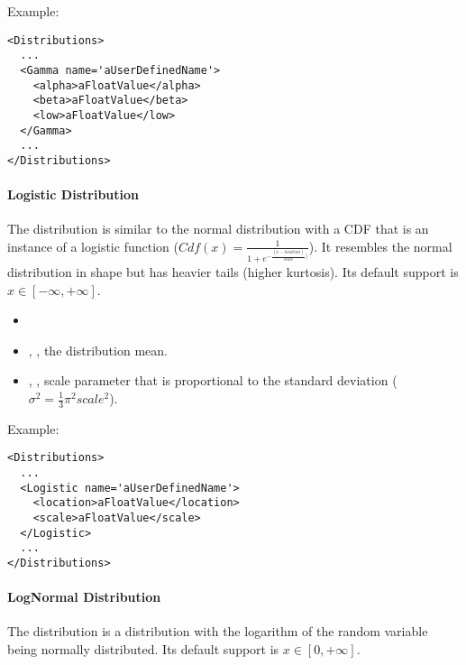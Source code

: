 Example:
\begin{lstlisting}[style=XML]
<Distributions>
  ...
  <Gamma name='aUserDefinedName'>
    <alpha>aFloatValue</alpha>
    <beta>aFloatValue</beta>
    <low>aFloatValue</low>
  </Gamma>
  ...
</Distributions>
\end{lstlisting}

\paragraph{Logistic Distribution}
\label{Logistic}
The  distribution is similar to the
normal distribution with a CDF that is an instance of a logistic function ($Cdf(x) = \frac{1}{1+e^{-\frac{(x-location)}{scale})}}$).
%
It resembles the normal distribution in shape but has heavier tails (higher
kurtosis).
%
Its default support is $x \in [-\infty,+\infty]$.

%
\attrIntro
\vspace{-5mm}
\begin{itemize}
  \itemsep0em
  \item \nameDescription
\end{itemize}
\vspace{-5mm}
\subnodesIntro
\begin{itemize}
  \item {}, , the
  distribution
  mean.
  \item {}, , scale parameter
  that
  is proportional to the standard deviation ($\sigma ^{2}=\frac{1}{3}\pi^{2}scale^{2} $).
\end{itemize}

Example:
\begin{lstlisting}[style=XML]
<Distributions>
  ...
  <Logistic name='aUserDefinedName'>
    <location>aFloatValue</location>
    <scale>aFloatValue</scale>
  </Logistic>
  ...
</Distributions>
\end{lstlisting}

\paragraph{LogNormal Distribution}
\label{LogNormal}
The  distribution is a distribution with the
logarithm of the random variable being normally distributed.
%
Its default support is $x \in [0, +\infty]$.

